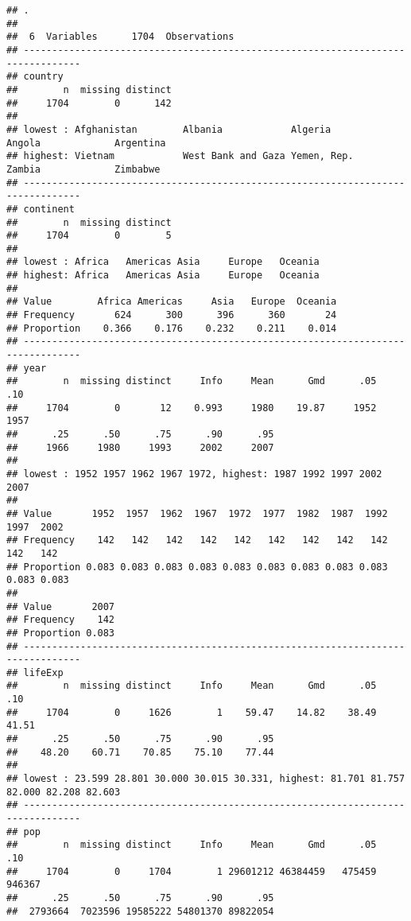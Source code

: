\documentclass[
]{book}
\begin{document}
\begin{verbatim}
## . 
## 
##  6  Variables      1704  Observations
## --------------------------------------------------------------------------------
## country 
##        n  missing distinct 
##     1704        0      142 
## 
## lowest : Afghanistan        Albania            Algeria            Angola             Argentina         
## highest: Vietnam            West Bank and Gaza Yemen, Rep.        Zambia             Zimbabwe          
## --------------------------------------------------------------------------------
## continent 
##        n  missing distinct 
##     1704        0        5 
## 
## lowest : Africa   Americas Asia     Europe   Oceania 
## highest: Africa   Americas Asia     Europe   Oceania 
##                                                        
## Value        Africa Americas     Asia   Europe  Oceania
## Frequency       624      300      396      360       24
## Proportion    0.366    0.176    0.232    0.211    0.014
## --------------------------------------------------------------------------------
## year 
##        n  missing distinct     Info     Mean      Gmd      .05      .10 
##     1704        0       12    0.993     1980    19.87     1952     1957 
##      .25      .50      .75      .90      .95 
##     1966     1980     1993     2002     2007 
## 
## lowest : 1952 1957 1962 1967 1972, highest: 1987 1992 1997 2002 2007
##                                                                             
## Value       1952  1957  1962  1967  1972  1977  1982  1987  1992  1997  2002
## Frequency    142   142   142   142   142   142   142   142   142   142   142
## Proportion 0.083 0.083 0.083 0.083 0.083 0.083 0.083 0.083 0.083 0.083 0.083
##                 
## Value       2007
## Frequency    142
## Proportion 0.083
## --------------------------------------------------------------------------------
## lifeExp 
##        n  missing distinct     Info     Mean      Gmd      .05      .10 
##     1704        0     1626        1    59.47    14.82    38.49    41.51 
##      .25      .50      .75      .90      .95 
##    48.20    60.71    70.85    75.10    77.44 
## 
## lowest : 23.599 28.801 30.000 30.015 30.331, highest: 81.701 81.757 82.000 82.208 82.603
## --------------------------------------------------------------------------------
## pop 
##        n  missing distinct     Info     Mean      Gmd      .05      .10 
##     1704        0     1704        1 29601212 46384459   475459   946367 
##      .25      .50      .75      .90      .95 
##  2793664  7023596 19585222 54801370 89822054 

\end{verbatim}
\end{document}

